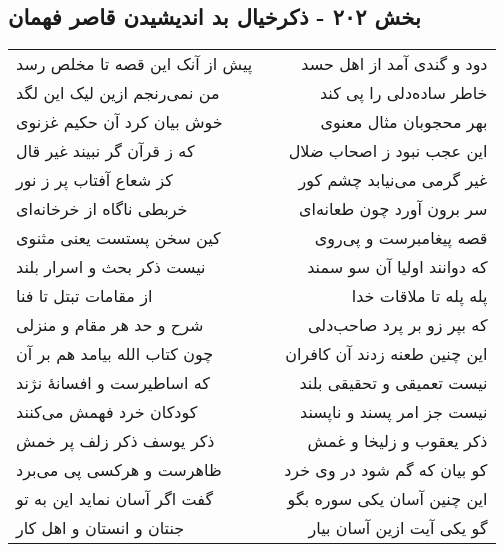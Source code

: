 \begin{center}
\section*{بخش ۲۰۲ - ذکرخیال بد اندیشیدن قاصر فهمان}
\label{sec:sh202}
\begin{longtable}{l p{0.5cm} r}
پیش از آنک این قصه تا مخلص رسد
&&
دود و گندی آمد از اهل حسد
\\
من نمی‌رنجم ازین لیک این لگد
&&
خاطر ساده‌دلی را پی کند
\\
خوش بیان کرد آن حکیم غزنوی
&&
بهر محجوبان مثال معنوی
\\
که ز قرآن گر نبیند غیر قال
&&
این عجب نبود ز اصحاب ضلال
\\
کز شعاع آفتاب پر ز نور
&&
غیر گرمی می‌نیابد چشم کور
\\
خربطی ناگاه از خرخانه‌ای
&&
سر برون آورد چون طعانه‌ای
\\
کین سخن پستست یعنی مثنوی
&&
قصه پیغامبرست و پی‌روی
\\
نیست ذکر بحث و اسرار بلند
&&
که دوانند اولیا آن سو سمند
\\
از مقامات تبتل تا فنا
&&
پله پله تا ملاقات خدا
\\
شرح و حد هر مقام و منزلی
&&
که بپر زو بر پرد صاحب‌دلی
\\
چون کتاب الله بیامد هم بر آن
&&
این چنین طعنه زدند آن کافران
\\
که اساطیرست و افسانهٔ نژند
&&
نیست تعمیقی و تحقیقی بلند
\\
کودکان خرد فهمش می‌کنند
&&
نیست جز امر پسند و ناپسند
\\
ذکر یوسف ذکر زلف پر خمش
&&
ذکر یعقوب و زلیخا و غمش
\\
ظاهرست و هرکسی پی می‌برد
&&
کو بیان که گم شود در وی خرد
\\
گفت اگر آسان نماید این به تو
&&
این چنین آسان یکی سوره بگو
\\
جنتان و انستان و اهل کار
&&
گو یکی آیت ازین آسان بیار
\\
\end{longtable}
\end{center}
